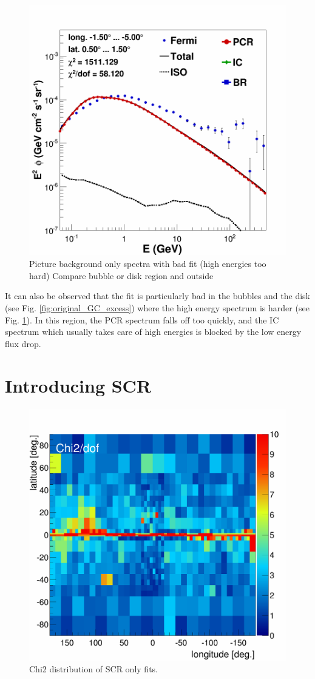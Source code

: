 \begin{figure}[h]
  \centering
  \includegraphics[width=.5\linewidth]{pic/results/BKGonly_CMZ.png}
  \caption{Picture background only spectra with bad fit (high energies too hard) Compare bubble or disk region and outside}
  \label{fig:bkgd_only_spectrum}
\end{figure}

It can also be observed that the fit is particularly bad in the bubbles and the disk (see Fig. \ref{fig:original_GC_excess}) where the high energy spectrum is harder (see Fig. \ref{fig:bkgd_only_spectrum}). In this region, the PCR spectrum falls off too quickly, and the IC spectrum which usually takes care of high energies is blocked by the low energy flux drop.




\section{Introducing SCR}

\begin{figure}[h]
  	\centering
	\includegraphics[width=.5\linewidth]{pic/results/SCRonly_Chi2Distribution.png}
  	\caption{Chi2 distribution of SCR only fits.}
  	\label{fig:SCRonly_fit}
\end{figure}

